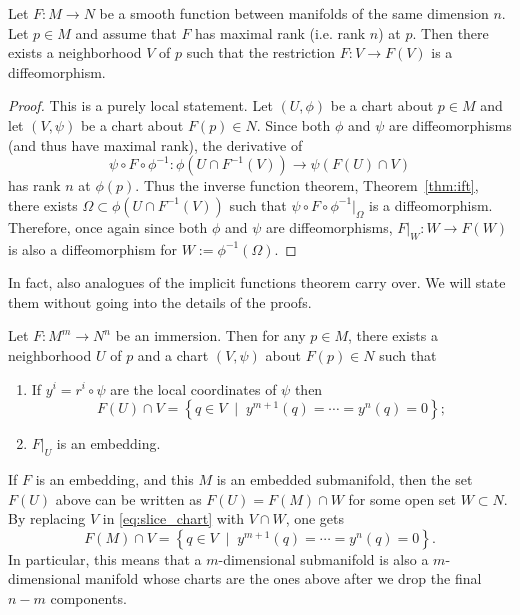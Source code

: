 \begin{thm}\label{thm:iftm}
    Let $F:M\to N$ be a smooth function between manifolds of the same dimension $n$.
    Let $p\in M$ and assume that $F$ has maximal rank (i.e. rank $n$) at $p$.
    Then there exists a neighborhood $V$ of $p$ such that the restriction $F:V\to F(V)$ is a diffeomorphism.
\end{thm}
\begin{proof}
    This is a purely local statement.
    Let $(U,\phi)$ be a chart about $p\in M$ and let $(V, \psi)$ be a chart about $F(p)\in N$.
    Since both $\phi$ and $\psi$ are diffeomorphisms (and thus have maximal rank), the derivative of
    \begin{equation}
        \psi \circ F \circ \phi^{-1}: \phi(U\cap F^{-1}(V)) \to \psi(F(U)\cap V)
    \end{equation}
    has rank $n$ at $\phi(p)$.
    Thus the inverse function theorem, Theorem~\ref{thm:ift}, there exists $\Omega \subset \phi(U\cap F^{-1}(V))$ such that $\psi \circ F \circ \phi^{-1}\big|_{\Omega}$ is a diffeomorphism.
    Therefore, once again since both $\phi$ and $\psi$ are diffeomorphisms, $F\big|_W : W \to F(W)$ is also a diffeomorphism for $W := \phi^{-1}(\Omega)$.
\end{proof}

In fact, also analogues of the implicit functions theorem carry over.
We will state them without going into the details of the proofs.

\begin{prop}
    Let $F:M^m\to N^n$ be an immersion.
    Then for any $p\in M$, there exists a neighborhood $U$ of $p$ and a chart $(V,\psi)$ about $F(p)\in N$ such that
    \begin{enumerate}\label{eq:slice_chart}
        \item If $y^i = r^i\circ \psi$ are the local coordinates of $\psi$ then
        \begin{equation}
            F(U)\cap V = \left\{ q \in V \;\mid\; y^{m+1}(q)=\cdots=y^n(q)=0\right\};
        \end{equation}
        \item $F\big|_U$ is an embedding.
    \end{enumerate}
 \end{prop}

If $F$ is an embedding, and this $M$ is an embedded submanifold, then the set $F(U)$ above can be written as $F(U) = F(M)\cap W$ for some open set $W\subset N$.
By replacing $V$ in \eqref{eq:slice_chart} with $V\cap W$, one gets 
\begin{equation}
    F(M)\cap V = \left\{ q \in V \;\mid\; y^{m+1}(q)=\cdots=y^n(q)=0\right\}.
\end{equation}
In particular, this means that a $m$-dimensional submanifold is also a $m$-dimensional manifold whose charts are the ones above after we drop the final $n-m$ components.

